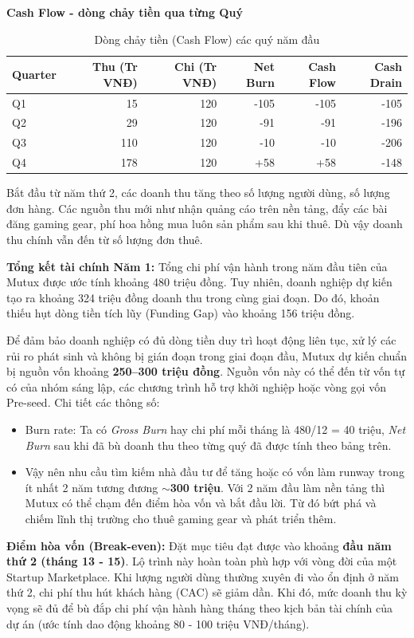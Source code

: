 \textbf{Cash Flow - dòng chảy tiền qua từng Quý}

\begin{table}[htbp]
    \centering
    \caption{Dòng chảy tiền (Cash Flow) các quý năm đầu}
    \begin{tabular}{@{}lrrrrr@{}}
        \toprule
        \textbf{Quarter} & \textbf{Thu (Tr VNĐ)} & \textbf{Chi (Tr VNĐ)} & \textbf{Net Burn} & \textbf{Cash Flow} & \textbf{Cash Drain} \\
        \midrule
        Q1 & 15 & 120 & -105 & -105 & -105 \\
        Q2 & 29 & 120 & -91 & -91 & -196 \\
        Q3 & 110 & 120 & -10 & -10 & -206 \\
        Q4 & 178 & 120 & +58 & +58 & -148 \\
        \bottomrule
    \end{tabular}
\end{table}

Bắt đầu từ năm thứ 2, các doanh thu tăng theo số lượng người dùng, số lượng đơn hàng. Các nguồn thu mới như nhận quảng cáo trên nền tảng, đẩy các bài đăng gaming gear, phí hoa hồng mua luôn sản phẩm sau khi thuê. Dù vậy doanh thu chính vẫn đến từ số lượng đơn thuê.

\textbf{Tổng kết tài chính Năm 1:} 
Tổng chi phí vận hành trong năm đầu tiên của Mutux được ước tính khoảng 480 triệu đồng. Tuy nhiên, doanh nghiệp dự kiến tạo ra khoảng 324 triệu đồng doanh thu trong cùng giai đoạn. Do đó, khoản thiếu hụt dòng tiền tích lũy (Funding Gap) vào khoảng 156 triệu đồng.

Để đảm bảo doanh nghiệp có đủ dòng tiền duy trì hoạt động liên tục, xử lý các rủi ro phát sinh và không bị gián đoạn trong giai đoạn đầu, Mutux dự kiến chuẩn bị nguồn vốn khoảng \textbf{250--300 triệu đồng}. Nguồn vốn này có thể đến từ vốn tự có của nhóm sáng lập, các chương trình hỗ trợ khởi nghiệp hoặc vòng gọi vốn Pre-seed. Chi tiết các thông số:
\begin{itemize}
    \item Burn rate: Ta có \textit{Gross Burn} hay chi phí mỗi tháng là 480/12 = 40 triệu, \textit{Net Burn} sau khi đã bù doanh thu theo từng quý đã được tính theo bảng trên.
    \item Vậy nên nhu cầu tìm kiếm nhà đầu tư để tăng hoặc có vốn làm runway trong ít nhất 2 năm tương đương \textbf{$\sim$300 triệu}. Với 2 năm đầu làm nền tảng thì Mutux có thể chạm đến điểm hòa vốn và bắt đầu lời. Từ đó bứt phá và chiếm lĩnh thị trường cho thuê gaming gear và phát triển thêm.
\end{itemize}

\textbf{Điểm hòa vốn (Break-even):} 
Đặt mục tiêu đạt được vào khoảng \textbf{đầu năm thứ 2 (tháng 13 - 15)}. Lộ trình này hoàn toàn phù hợp với vòng đời của một Startup Marketplace. Khi lượng người dùng thường xuyên đi vào ổn định ở năm thứ 2, chi phí thu hút khách hàng (CAC) sẽ giảm dần. Khi đó, mức doanh thu kỳ vọng sẽ đủ để bù đắp chi phí vận hành hàng tháng theo kịch bản tài chính của dự án (ước tính dao động khoảng 80 - 100 triệu VNĐ/tháng).
